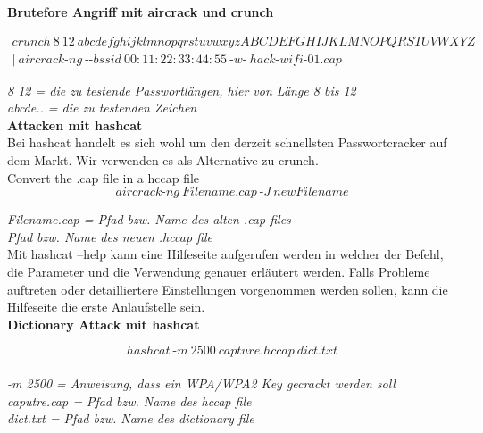 \textbf{Brutefore Angriff mit aircrack und crunch}

\begin{equation*}
\begin{split}
crunch~8~12~abcdefghijklmnopqrstuvwxyzABCDEFGHIJKLMNOPQRSTUVWXYZ \\
|~aircrack\text{-}ng~\text{-}\text{-}bssid~00:11:22:33:44:55~\text{-}w\text{-}~hack\text{-}wifi\text{-}01.cap
\end{split}
\end{equation*}
 
\textit{8 12 = die zu testende Passwortlängen, hier von Länge 8 bis 12}\\
\textit{abcde.. = die zu testenden Zeichen}\\



\textbf{Attacken mit hashcat}\\

Bei hashcat handelt es sich wohl um den derzeit schnellsten Passwortcracker auf dem Markt. Wir verwenden es als Alternative zu crunch.\\

Convert the .cap file in a hccap file\\

$$aircrack\text{-}ng~Filename.cap~\text{-}J~newFilename$$

\textit{Filename.cap = Pfad bzw. Name des alten .cap files}\\
\textit{Pfad bzw. Name des neuen .hccap file}\\


Mit hashcat --help kann eine Hilfeseite aufgerufen werden in welcher der Befehl, die Parameter und die Verwendung
genauer erläutert werden. Falls Probleme auftreten oder detailliertere Einstellungen vorgenommen werden sollen, kann 
die Hilfeseite die erste Anlaufstelle sein.\\

\textbf{Dictionary Attack mit hashcat}

$$hashcat~\text{-}m~2500~capture.hccap~dict.txt$$\\

\textit{-m 2500 = Anweisung, dass ein WPA/WPA2 Key gecrackt werden soll}\\
\textit{caputre.cap = Pfad bzw. Name des hccap file}\\
\textit{dict.txt = Pfad bzw. Name des dictionary file}\\


